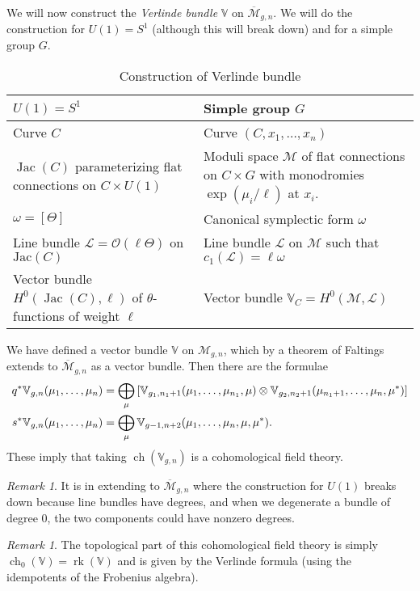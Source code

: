 \documentclass[leqno, openany]{memoir}
\theoremstyle{definition}
\theoremstyle{remark}
\newtheorem{rmk}[thm]{Remark}
\theoremstyle{plain}
\theoremstyle{definition}
\theoremstyle{remark}
\newcommand{\mc}[1]{\mathcal{#1}}
\newcommand{\mr}[1]{\mathrm{#1}}
\newcommand{\on}[1]{\operatorname{#1}}
\newcommand{\ol}[1]{\overline{#1}}
\DeclareMathOperator{\ch}{ch}
\begin{document}
We will now construct the \textit{Verlinde bundle} $\mathbb{V}$ on $\ol{\mc{M}}_{g,n}$. We will do the construction for $U(1) = S^1$ (although this will break down) and for a simple group $G$. 
\begin{table}[htpb]
  \centering
  \caption{Construction of Verlinde bundle}
  \label{tab:verlinde}
  \begin{tabular}{p{}p{}}
    \toprule
    $U(1) = S^1$ & Simple group $G$ \\
    \midrule
    Curve $C$ & Curve $(C, x_1, \ldots, x_n)$ \\
    $\on{Jac}(C)$ parameterizing flat connections on $C \times U(1)$ & Moduli space $\mc{M}$ of flat connections on $C \times G$ with monodromies $\exp(\mu_i/\ell)$ at $x_i$. \\
    $\omega = [\Theta]$ & Canonical symplectic form $\omega$ \\
    Line bundle $\mc{L} = \mc{O}(\ell \Theta)$ on $\mr{Jac}(C)$ & Line bundle $\mc{L}$ on $\mc{M}$ such that $c_1(\mc{L}) = \ell \omega$ \\
    Vector bundle $H^0(\on{Jac}(C), \ell)$ of $\theta$-functions of weight $\ell$ & Vector bundle $\mathbb{V}_C = H^0(\mc{M}, \mc{L})$ \\
    \bottomrule
  \end{tabular}
\end{table}

We have defined a vector bundle $\mathbb{V}$ on $\mc{M}_{g,n}$, which by a theorem of Faltings extends to $\ol{\mc{M}}_{g,n}$ as a vector bundle. Then there are the formulae
\begin{align*}
  q^* \mathbb{V}_{g,n}(\mu_1, \ldots, \mu_n) &= \bigoplus_{\mu} \qty[\mathbb{V}_{g_1,n_1+1}(\mu_1, \ldots, \mu_{n_1},\mu)\otimes \mathbb{V}_{g_2,n_2+1}(\mu_{n_1+1}, \ldots, \mu_n, \mu^*)] \\
  s^* \mathbb{V}_{g,n}(\mu_1, \ldots, \mu_n) &= \bigoplus_{\mu} \mathbb{V}_{g-1,n+2}(\mu_1, \ldots, \mu_n, \mu, \mu^*).
\end{align*}
These imply that taking $\ch(\mathbb{V}_{g,n})$ is a cohomological field theory.

\begin{rmk}
It is in extending to $\ol{\mc{M}}_{g,n}$ where the construction for $U(1)$ breaks down because line bundles have degrees, and when we degenerate a bundle of degree $0$, the two components could have nonzero degrees.
\end{rmk}

\begin{rmk}
The topological part of this cohomological field theory is simply $\ch_0(\mathbb{V}) = \on{rk}(\mathbb{V})$ and is given by the Verlinde formula (using the idempotents of the Frobenius algebra).
\end{rmk}
\end{document}
